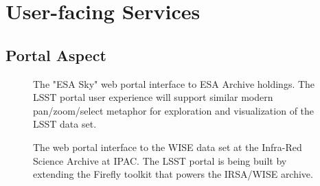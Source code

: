 \section{User-facing Services}

\subsection{Portal Aspect\label{sec:portal}}

\begin{figure}
	\centering
	\caption{The "ESA Sky" web portal interface to ESA Archive holdings. The LSST portal user
		experience will support similar modern pan/zoom/select metaphor for exploration and visualization of the LSST data set.
		\label{fig:portalESA}}
\end{figure}

\begin{figure}
	\centering
	\caption{The web portal interface to the WISE data set at the Infra-Red Science Archive at IPAC. The LSST portal is being built by extending the Firefly toolkit that powers the IRSA/WISE archive.
		\label{fig:portalIRSA}}
\end{figure}

